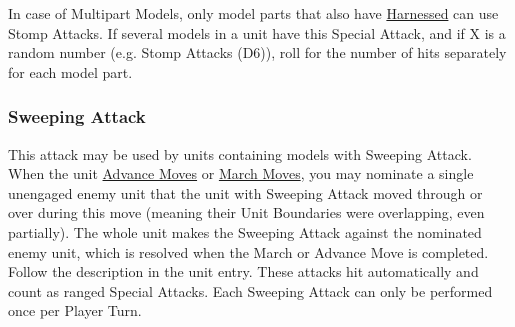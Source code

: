 In case of Multipart Models, only model parts that also have \hyperref[harnessed]{Harnessed} can use Stomp Attacks. If several models in a unit have this Special Attack, and if X is a random number (e.g. Stomp Attacks (D6)), roll for the number of hits separately for each model part.

\subsubsection{Sweeping Attack}
\idx[main=y]{\sweepingattack}\label{sweeping_attack}

This attack may be used by units containing models with Sweeping Attack. When the unit \hyperref[advance_move]{Advance Moves} or \hyperref[march_move]{March Moves}, you may nominate a single unengaged enemy unit that the unit with Sweeping Attack moved through or over during this move (meaning their Unit Boundaries were overlapping, even partially). The whole unit makes the Sweeping Attack against the nominated enemy unit, which is resolved when the March or Advance Move is completed. Follow the description in the unit entry. These attacks hit automatically and count as ranged Special Attacks. Each Sweeping Attack can only be performed once per Player Turn.

\RBemc
